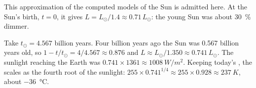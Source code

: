 This approximation of the computed models of the Sun is admitted here. At the
Sun's birth, $t = 0$, it gives $L = L_\odot/1.4 \approx 0.71\,L_\odot$:
the young Sun was about \qty{30}{\percent} dimmer.

\begin{example}\label{ex:g12:early-earth:young-sun}
Take $t_\odot = 4.567$ billion years. Four billion years ago the Sun was
0.567 billion years old, so $1 - t/t_\odot = 4/4.567 \approx 0.876$ and
$L \approx L_\odot/1.350 \approx 0.741\,L_\odot$. The sunlight reaching the
Earth was $0.741 \times 1361 \approx \qty{1008}{W/m^2}$. Keeping today's
, the  scales as the fourth root of the
sunlight: $255 \times 0.741^{1/4} \approx 255 \times 0.928 \approx
\qty{237}{K}$, about \qty{-36}{\celsius}.
\end{example}

